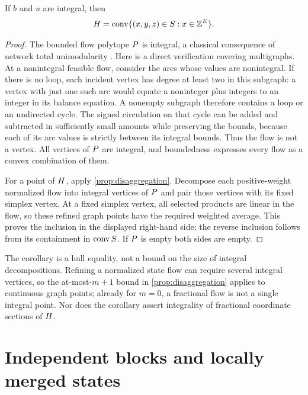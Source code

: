 \begin{corollary}\label{cor:integral-flows}
If $b$ and $u$ are integral, then
\[
 H=\operatorname{conv}\{(x,y,z)\in S:x\in\mathbb Z^E\}.
\]
\end{corollary}
\begin{proof}
The bounded flow polytope $P$ is integral, a classical consequence of
network total unimodularity \citep{HoffmanKruskal1956}. Here is a direct
verification covering multigraphs. At a nonintegral feasible flow, consider
the arcs whose values are nonintegral. If there is no loop, each incident
vertex has degree at least two in this subgraph: a vertex with just one
such arc would equate a noninteger plus integers to an integer in its
balance equation. A nonempty subgraph therefore contains a loop or an
undirected cycle. The signed
circulation on that cycle can be added and subtracted in sufficiently small
amounts while preserving the bounds, because each of its arc values is
strictly between its integral bounds. Thus the flow is not a vertex.
All vertices of $P$ are integral, and boundedness expresses every
flow as a convex combination of them.

For a point of $H$, apply \cref{prop:disaggregation}. Decompose each
positive-weight normalized flow into integral vertices of $P$ and
pair those vertices with its fixed simplex vertex. At a fixed simplex
vertex, all selected products are linear in the flow, so these refined
graph points have the required weighted average. This proves the inclusion
in the displayed right-hand side; the reverse inclusion follows from its
containment in $\operatorname{conv} S$. If $P$ is empty both sides are empty.
\end{proof}

The corollary is a hull equality, not a bound on the size of integral
decompositions. Refining a normalized state flow can require several
integral vertices, so the at-most-$m+1$ bound in \cref{prop:disaggregation}
applies to continuous graph points; already for $m=0$, a fractional flow is
not a single integral point. Nor does the corollary assert integrality of
fractional coordinate sections of $H$.

\section{Independent blocks and locally merged states}\label{sec:blocks}

